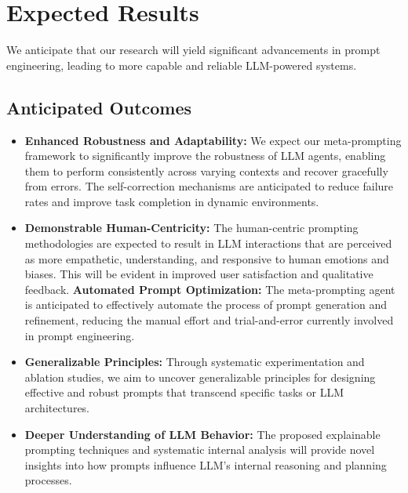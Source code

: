 \documentclass{article}
\begin{document}
\section{Expected Results}
We anticipate that our research will yield significant advancements in prompt engineering, leading to more capable and reliable LLM-powered systems.

\subsection{Anticipated Outcomes}
\begin{itemize}
    \item \textbf{Enhanced Robustness and Adaptability:} We expect our meta-prompting framework to significantly improve the robustness of LLM agents, enabling them to perform consistently across varying contexts and recover gracefully from errors. The self-correction mechanisms are anticipated to reduce failure rates and improve task completion in dynamic environments.
    \item \textbf{Demonstrable Human-Centricity:} The human-centric prompting methodologies are expected to result in LLM interactions that are perceived as more empathetic, understanding, and responsive to human emotions and biases. This will be evident in improved user satisfaction and qualitative feedback.
    \textbf{Automated Prompt Optimization:} The meta-prompting agent is anticipated to effectively automate the process of prompt generation and refinement, reducing the manual effort and trial-and-error currently involved in prompt engineering.
    \item \textbf{Generalizable Principles:} Through systematic experimentation and ablation studies, we aim to uncover generalizable principles for designing effective and robust prompts that transcend specific tasks or LLM architectures.
    \item \textbf{Deeper Understanding of LLM Behavior:} The proposed explainable prompting techniques and systematic internal analysis will provide novel insights into how prompts influence LLM's internal reasoning and planning processes.
\end{itemize}
\end{document}
